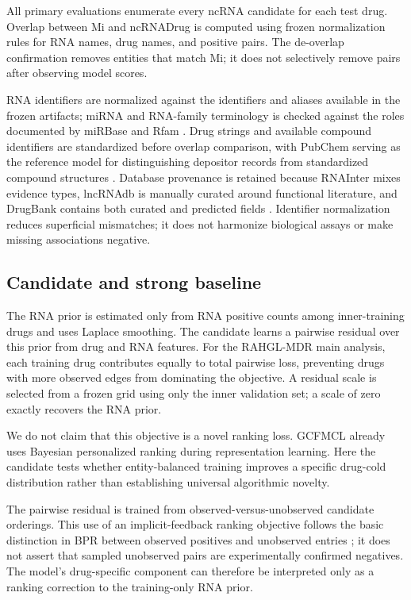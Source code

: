\documentclass[10pt]{article}
\begin{document}
All primary evaluations enumerate every ncRNA candidate for each test drug. Overlap between Mi and ncRNADrug is computed using frozen normalization rules for RNA names, drug names, and positive pairs. The de-overlap confirmation removes entities that match Mi; it does not selectively remove pairs after observing model scores.

RNA identifiers are normalized against the identifiers and aliases available in the frozen artifacts; miRNA and RNA-family terminology is checked against the roles documented by miRBase and Rfam \citep{kozomara2014mirbase,kalvari2021rfam}. Drug strings and available compound identifiers are standardized before overlap comparison, with PubChem serving as the reference model for distinguishing depositor records from standardized compound structures \citep{kim2023pubchem}. Database provenance is retained because RNAInter mixes evidence types, lncRNAdb is manually curated around functional literature, and DrugBank contains both curated and predicted fields \citep{kang2022rnainter,quek2015lncrnadb,wishart2018drugbank}. Identifier normalization reduces superficial mismatches; it does not harmonize biological assays or make missing associations negative.

\subsection{Candidate and strong baseline}

The RNA prior is estimated only from RNA positive counts among inner-training drugs and uses Laplace smoothing. The candidate learns a pairwise residual over this prior from drug and RNA features. For the RAHGL-MDR main analysis, each training drug contributes equally to total pairwise loss, preventing drugs with more observed edges from dominating the objective. A residual scale is selected from a frozen grid using only the inner validation set; a scale of zero exactly recovers the RNA prior.

We do not claim that this objective is a novel ranking loss. GCFMCL already uses Bayesian personalized ranking during representation learning. Here the candidate tests whether entity-balanced training improves a specific drug-cold distribution rather than establishing universal algorithmic novelty.

The pairwise residual is trained from observed-versus-unobserved candidate orderings. This use of an implicit-feedback ranking objective follows the basic distinction in BPR between observed positives and unobserved entries \citep{rendle2009bpr}; it does not assert that sampled unobserved pairs are experimentally confirmed negatives. The model's drug-specific component can therefore be interpreted only as a ranking correction to the training-only RNA prior.
\end{document}
